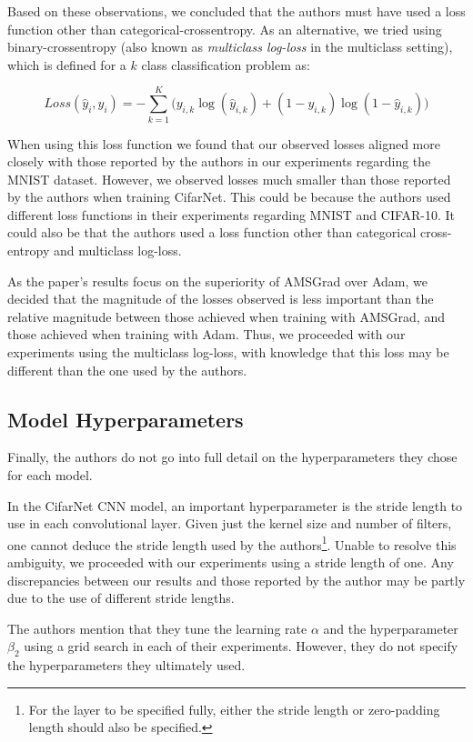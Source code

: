 \documentclass[letterpaper, 10 pt, conference]{ieeeconf}  %
\begin{document}
Based on these observations, we concluded that the authors must have used a loss function other than categorical-crossentropy. As an alternative, we tried using binary-crossentropy (also known as \emph{multiclass log-loss} in the multiclass setting), which is defined for a $k$ class classification problem as:

\[
Loss(\hat{y}_i, y_i) = -\sum_{k = 1}^K \big( y_{i,k}\log(\hat{y}_{i,k}) + (1 - y_{i,k})\log(1 - \hat{y}_{i,k})  \big)
\]

When using this loss function we found that our observed losses aligned more closely with those reported by the authors in our experiments regarding the MNIST dataset. However, we observed losses much smaller than those reported by the authors when training CifarNet. This could be because the authors used different loss functions in their experiments regarding MNIST and CIFAR-10. It could also be that the authors used a loss function other than categorical cross-entropy and multiclass log-loss.

As the paper's results focus on the superiority of AMSGrad over Adam, we decided that the magnitude of the losses observed is less important than the relative magnitude between those achieved when training with AMSGrad, and those achieved when training with Adam. Thus, we proceeded with our experiments using the multiclass log-loss, with knowledge that this loss may be different than the one used by the authors.

\subsection{Model Hyperparameters}

Finally, the authors do not go into full detail on the hyperparameters they chose for each model. 

In the CifarNet CNN model, an important hyperparameter is the stride length to use in each convolutional layer. Given just the kernel size and number of filters, one cannot deduce the stride length used by the authors\footnote{For the layer to be specified fully, either the stride length or zero-padding length should also be specified.}. Unable to resolve this ambiguity, we proceeded with our experiments using a stride length of one. Any discrepancies between our results and those reported by the author may be partly due to the use of different stride lengths. 

The authors mention that they tune the learning rate $\alpha$ and the hyperparameter $\beta_2$ using a grid search in each of their experiments. However, they do not specify the hyperparameters they ultimately used. 
\end{document}
